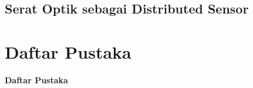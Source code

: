 \documentclass[12pt]{article}
\begin{document}
	\subsection{Serat Optik sebagai Distributed Sensor}
	
	
	
	
\newpage

	\section{Daftar Pustaka}
	
	\begin{center}
		\textbf{Daftar Pustaka}
	\end{center}
	
	
	

	
\end{document}
